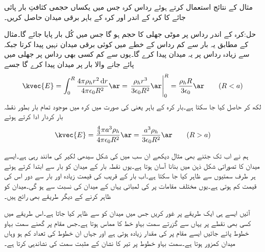 مثال  کے نتائج استعمال کرتے ہوئے   رداس کرہ جس میں یکساں  حجمی کثافتِ بار پائی جائے کا کرہ کے اندر اور کرہ کے باہر برقی میدان  حاصل کریں۔

حل:کرہ کے اندر رداس  پر  موٹی جھلی کا حجم  ہو گا جس میں کُل  بار پایا جائے گا۔مثال   کے مطابق یہ بار  سے کم رداس کے خطے میں کوئی برقی میدان نہیں پیدا کرتا جبکہ  سے زیادہ رداس پر یہ میدان پیدا کرے گا۔یوں  سے کم کسی بھی رداس پر جھلی میں پائے جانے والا بار  پر میدان پیدا کرے گا جسے
\begin{align}
\kvec{E}=\int_0^{R} \frac{4\pi \rho_h r^2 \dif r}{4\pi \epsilon_0 R^2} \ar=\left. \frac{\rho_h r^3}{3\epsilon_0 R^2} \ar\right|_0^R=\frac{\rho_h R}{3\epsilon_0}\ar \quad \quad (R<a)
\end{align}
لکھ کر حاصل کیا جا سکتا ہے۔بار کرہ کے باہر یعنی  کی صورت میں کرہ میں موجود تمام بار بطور نقطہ بار کردار ادا کرتے ہوئے
\begin{align}
\kvec{E}=\frac{\frac{4}{3} \pi a^3 \rho_h}{4\pi \epsilon_0 R^2}\ar=\frac{ a^3 \rho_h}{3\epsilon_0 R^2}\ar  \quad \quad (R>a)
\end{align}

ہم نے اب تک جتنے بھی مثال دیکھے ان سب میں  کی شکل سیدھی لکیر کی مانند رہی ہے۔ایسے میدان کا تصوراتی شکل ذہن میں بنانا آسان ہوتا ہے۔یوں نقطہ بار کے میدان کو بار سے ابتدا کرتے ہوئے ہر طرف سمتیوں سے ظاہر کیا جا سکتا ہے۔اب بار کے قریب  کی قیمت زیادہ اور بار سے دور اس کی قیمت کم ہوتی ہے۔یوں مختلف مقامات پر  کی لمبائی یہاں کے میدان کی نسبت سے ہو گی۔میدان کو ظاہر کرنے کے دیگر طریقے بھی رائج ہیں۔

آئیں ایسے ہی ایک طریقے پر غور کریں جس میں میدان کو  سے ظاہر کیا جاتا ہے۔اس طریقے میں کسی بھی نقطے  پر  یہاں سے گزرتے سمت بہاو خط کا مماس ہوتا ہے۔جس مقام پر گھنے سمت بہاو خطوط  پائے جائیں ایسے مقام پر  کی مقدار زیادہ ہوتی ہے اور جہاں ان خطوط کی تعداد کم ہو وہاں میدان کمزور ہوتا ہے۔سمت بہاو خطوط پر تیر کا نشان  کے مثبت سمت کی نشاندہی کرتا ہے۔
 
